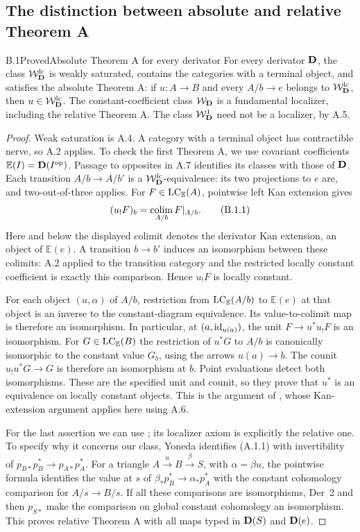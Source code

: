 \subsection{The distinction between absolute and relative Theorem A}

\begin{claim}{B.1}{Proved}{Absolute Theorem A for every derivator}
For every derivator $\mathbf D$, the class $\mathcal W_{\mathbf D}^{\mathrm{lc}}$ is weakly saturated,
contains the categories with a terminal object, and satisfies the
absolute Theorem A: if $u:A\to B$ and every $A/b\to e$ belongs to
$\mathcal W_{\mathbf D}^{\mathrm{lc}}$, then $u\in\mathcal W_{\mathbf D}^{\mathrm{lc}}$. The constant-coefficient class $\mathcal W_{\mathbf D}$
is a fundamental localizer, including the relative Theorem A.
The class $\mathcal W_{\mathbf D}^{1}$ need not be a localizer, by A.5.
\end{claim}
\begin{proof}
Weak saturation is A.4. A category with a terminal object has
contractible nerve, so A.2 applies. To check the first Theorem A,
we use covariant coefficients $\mathbb E(I)=\mathbf D(I^{\mathrm{op}})$.
Passage to opposites in A.7 identifies its classes with those of
$\mathbf D$. Each transition $A/b\to A/b'$ is a $\mathcal W_{\mathbf D}^{\mathrm{lc}}$-equivalence:
its two projections to $e$ are, and two-out-of-three applies.
For $F\in\operatorname{LC}_{\mathbb E}(A)$, pointwise left Kan extension gives
\[
 (u_!F)_b=\operatorname*{colim}_{A/b}F|_{A/b}.
 \tag{B.1.1}
\]
Here and below the displayed colimit denotes the derivator Kan
extension, an object of $\mathbb E(e)$. A transition $b\to b'$
induces an isomorphism between these colimits: A.2 applied to the
transition category and the restricted locally constant coefficient
is exactly this comparison. Hence $u_!F$ is locally constant.

For each object $(a,\alpha)$ of $A/b$, restriction from
$\operatorname{LC}_{\mathbb E}(A/b)$ to $\mathbb E(e)$ at that object is an
inverse to the constant-diagram equivalence. Its value-to-colimit
map is therefore an isomorphism. In particular, at
$(a,\mathrm{id}_{u(a)})$, the unit $F\to u^*u_!F$ is an isomorphism.
For $G\in\operatorname{LC}_{\mathbb E}(B)$ the restriction of $u^*G$ to
$A/b$ is canonically isomorphic to the constant value $G_b$,
using the arrows $u(a)\to b$. The counit $u_!u^*G\to G$ is
therefore an isomorphism at $b$. Point evaluations detect both
isomorphisms. These are the specified unit and counit, so they
prove that $u^*$ is an equivalence on locally constant objects.
This is the argument of \citet[Proposition~1.27]{Cisinski2009LocallyConstant},
whose Kan-extension argument applies here using A.6.

For the last assertion we can use
\citet[Proposition~3.7]{Cisinski2008}; its localizer axiom is
explicitly the relative one. To specify why it concerns our class,
Yoneda identifies (A.1.1) with invertibility of
$p_{B*}p_B^*\to p_{A*}p_A^*$. For a triangle
$A\xrightarrow{u}B\xrightarrow{\beta}S$, with
$\alpha=\beta u$, the pointwise formula identifies the value at
$s$ of $\beta_*p_B^*\to\alpha_*p_A^*$ with the constant
cohomology comparison for $A/s\to B/s$. If all these comparisons
are isomorphisms, Der~2 and then $p_{S*}$ make the comparison on
global constant cohomology an isomorphism. This proves relative
Theorem A with all maps typed in $\mathbf D(S)$ and $\mathbf D(e)$.
\end{proof}

